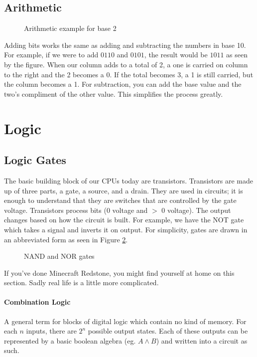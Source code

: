 \subsection{Arithmetic}
\begin{figure}[!htb]
	\caption{\label{fig:adding} Arithmetic example for base 2}
\end{figure}
Adding bits works the same as adding and subtracting the numbers in base 10. For example, if we were to add $0110$ and $0101$, the result would be $1011$ as seen by the figure. When our column adds to a total of 2, a one is carried on column to the right and the 2 becomes a 0. If the total becomes 3, a 1 is still carried, but the column becomes a 1.
For subtraction, you can add the base value and the two's compliment of the other value. This simplifies the process greatly.

\section{Logic}
\subsection{Logic Gates}
The basic building block of our CPUs today are transistors. Transistors are made up of three parts, a gate, a source, and a drain. They are used in circuits; it is enough to understand that they are switches that are controlled by the gate voltage.
Transistors process bits (0 voltage and $>$ 0 voltage). The output changes based on how the circuit is built. For example, we have the NOT gate which takes a signal and inverts it on output. For simplicity, gates are drawn in an abbreviated form as seen in Figure \ref{fig:gates}.
\begin{figure}[!htb]
	\caption{\label{fig:gates} NAND and NOR gates}
\end{figure}
If you've done Minecraft Redstone, you might find yourself at home on this section. Sadly real life is a little more complicated.
\paragraph{Combination Logic} A general term for blocks of digital logic which contain no kind of memory. For each $n$ inputs, there are $2^n$ possible output states. Each of these outputs can be represented by a basic boolean algebra (eg. $A\wedge B$) and written into a circuit as such.

